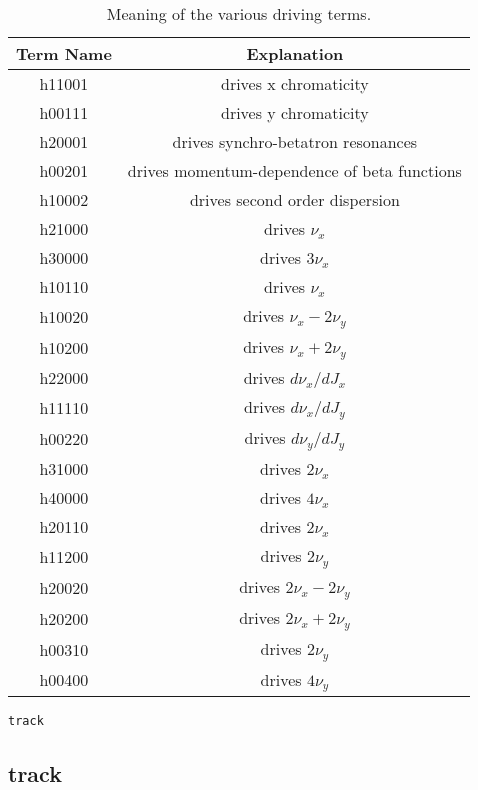 \documentclass[11pt]{article}
\begin{document}
\begin{table}[htb]\caption{Meaning of the various driving terms\cite{Bengtsson}.}
\begin{center}
\begin{tabular}{|c|c|}\hline
Term Name & Explanation \\  \hline \hline
h11001 & drives x chromaticity \\ \hline
h00111 & drives y chromaticity \\ \hline
h20001 & drives synchro-betatron resonances \\ \hline
h00201 & drives momentum-dependence of beta functions \\ \hline
h10002 & drives second order dispersion \\ \hline
h21000 & drives $\nu_x$ \\ \hline
h30000 & drives $3 \nu_x$ \\ \hline
h10110 & drives $\nu_x$ \\ \hline
h10020 & drives $\nu_x - 2 \nu_y$ \\ \hline
h10200 & drives $\nu_x + 2 \nu_y$ \\ \hline
h22000 & drives $d\nu_x/dJ_x$\\ \hline
h11110 & drives $d\nu_x/dJ_y$ \\ \hline
h00220 & drives $d\nu_y/dJ_y$ \\ \hline
h31000 & drives $2 \nu_x$ \\ \hline
h40000 & drives $4 \nu_x$ \\ \hline
h20110 & drives $2 \nu_x$ \\ \hline
h11200 & drives $2 \nu_y$ \\ \hline
h20020 & drives $2 \nu_x - 2 \nu_y$ \\ \hline
h20200 & drives $2 \nu_x + 2 \nu_y$ \\ \hline
h00310 & drives $2 \nu_y$ \\ \hline
h00400 & drives $4 \nu_y$ \\ \hline
\end{tabular}
\end{center}
\label{tab:drivingTerms}
\end{table}

\begin{latexonly}
\newpage
\begin{center}{\Large\verb|track|}\end{center}
\end{latexonly}
\subsection{track \label{subsec:track}}
\end{document}
